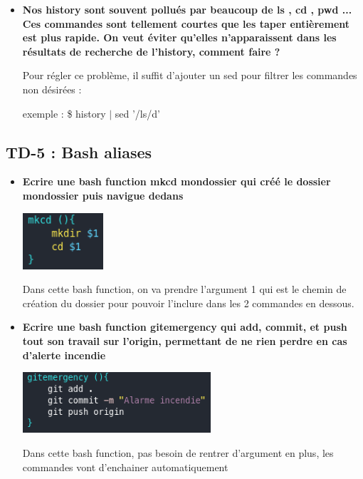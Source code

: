 \documentclass[12pt]{article}
\begin{document}
\begin{itemize}
  \item \textbf{Nos history sont souvent pollués par beaucoup de ls , cd , pwd ...
  Ces commandes sont tellement courtes que les taper entièrement est plus rapide.
  On veut éviter qu'elles n'apparaissent dans les résultats de recherche de
  l'history, comment faire ?}
  \vspace{0.3cm}

  Pour régler ce problème, il suffit d'ajouter un sed pour filtrer les commandes non désirées : \newline

  exemple : \$ history $|$ sed '/ls/d'

\end{itemize}

  \subsection{TD-5 : Bash aliases}
\vspace{0.3cm}

\begin{itemize}
  \item \textbf{Ecrire une bash function mkcd mondossier qui créé le dossier mondossier
  puis navigue dedans}
  \vspace{0.3cm}

  \includegraphics[width=3cm]{screen-mkcd-td5.png}
  \vspace{0.3cm}

  Dans cette bash function, on va prendre l'argument 1 qui est le chemin de création du dossier pour pouvoir
  l'inclure dans les 2 commandes en dessous.

\end{itemize}

\vspace{0.3cm}

\begin{itemize}
  \item \textbf{Ecrire une bash function gitemergency qui add, commit, et push tout son
  travail sur l'origin, permettant de ne rien perdre en cas d'alerte incendie}
  \vspace{0.3cm}

  \includegraphics[width=7cm]{screen-gitemergency-td5.png}
  \vspace{0.3cm}

  Dans cette bash function, pas besoin de rentrer d'argument en plus, les commandes vont d'enchainer automatiquement
\end{itemize}
\end{document}
